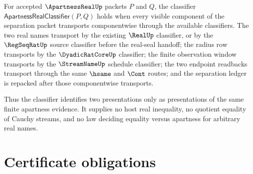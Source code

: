 \begin{definition}
\label{def:apartnessreal-classifier}
For accepted $\ApartnessRealUp$ packets $P$ and $Q$, the classifier $\mathsf{ApartnessRealClassifier}(P,Q)$ holds when every visible component of the separation packet transports componentwise through the available classifiers. The two real names transport by the existing $\RealUp$ classifier, or by the $\RegSeqRatUp$ source classifier before the real-seal handoff; the radius row transports by the $\DyadicRatCoreUp$ classifier; the finite observation window transports by the $\StreamNameUp$ schedule classifier; the two endpoint readbacks transport through the same $\hsame$ and $\Cont$ routes; and the separation ledger is repacked after those componentwise transports.

Thus the classifier identifies two presentations only as presentations of the same finite apartness evidence. It supplies no host real inequality, no quotient equality of Cauchy streams, and no law deciding equality versus apartness for arbitrary real names.
\end{definition}

\section{Certificate obligations}
\label{sec:apartnessreal-certificate-obligations}

